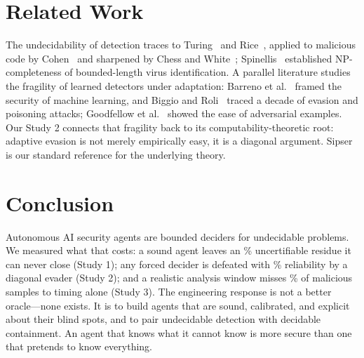 \documentclass[11pt]{article}
\theoremstyle{plain}
\theoremstyle{definition}
\begin{document}
\section{Related Work}
\label{sec:related}
The undecidability of detection traces to Turing~\cite{turing1936} and
Rice~\cite{rice1953}, applied to malicious code by Cohen~\cite{cohen1987} and
sharpened by Chess and White~\cite{chesswhite2000}; Spinellis~\cite{spinellis2003}
established \textsc{NP}-completeness of bounded-length virus identification. A
parallel literature studies the fragility of learned detectors under
adaptation: Barreno et al.~\cite{barreno2010} framed the security of machine
learning, and Biggio and Roli~\cite{biggiroli2018} traced a decade of evasion
and poisoning attacks; Goodfellow et al.~\cite{goodfellow2015} showed the ease
of adversarial examples. Our Study 2 connects that fragility back to its
computability-theoretic root: adaptive evasion is not merely empirically easy,
it is a diagonal argument. Sipser~\cite{sipser2013} is our standard reference
for the underlying theory.

\section{Conclusion}
\label{sec:conclusion}
Autonomous AI security agents are bounded deciders for undecidable problems. We
measured what that costs: a sound agent leaves an \expNonhaltPct\%
uncertifiable residue it can never close (Study 1); any forced decider is
defeated with \expEvRate\% reliability by a diagonal evader (Study 2); and a
realistic analysis window misses \expSbFnr\% of malicious samples to timing
alone (Study 3). The engineering response is not a better oracle---none exists.
It is to build agents that are sound, calibrated, and explicit about their
blind spots, and to pair undecidable detection with decidable containment. An
agent that knows what it cannot know is more secure than one that pretends to
know everything.
\end{document}
